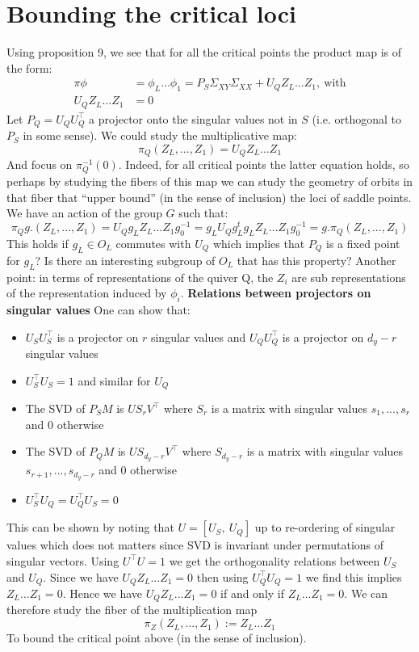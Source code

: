 \documentclass{article}
\theoremstyle{definition}
\begin{document}
\section{Bounding the critical loci}
Using proposition 9, we see that for all the critical points the product map is of the form:
\begin{align*}
    \pi{\phi} & = \phi_L\dots \phi_1 = P_S\Sigma_{XY}\Sigma_{XX} + U_QZ_L\dots Z_1, \ \text{with}\\
    U_QZ_L\dots Z_1 & = 0
\end{align*}
Let $P_Q = U_QU_Q^{\top}$ a projector onto the singular values not in $S$ (i.e. orthogonal to $P_S$ in some sense). We could study the multiplicative map:
\begin{equation*}
    \pi_Q (Z_L,...,Z_1) = U_QZ_L\dots Z_1
\end{equation*}
And focus on $\pi_Q^{-1}(0)$. Indeed, for all critical points the latter equation holds, so perhaps by studying the fibers of this map we can study the geometry of orbits in that fiber that ``upper bound'' (in the sense of inclusion) the loci of saddle points.
We have an action of the group $G$ such that:
\begin{equation*}
    \pi_Q g.(Z_L,...,Z_1) = U_Qg_LZ_L\dots Z_1g_0^{-1} = g_LU_Qg_L^tg_LZ_L\dots Z_1g_0^{-1} = g.\pi_Q (Z_L,...,Z_1)
\end{equation*}
This holds if $g_L\in O_L$ commutes with $U_Q$ which implies that $P_Q$ is a fixed point for $g_L$? Is there an interesting subgroup of $O_L$ that has this property?
Another point: in terms of representations of the quiver Q, the $Z_i$ are sub representations of the representation induced by $\phi_i$.
\textbf{Relations between projectors on singular values}
One can show that:
\begin{itemize}
    \item $U_SU_S^{\top}$ is a projector on $r$ singular values and $U_QU_Q^{\top}$ is a projector on $d_y-r$ singular values
    \item $U_S^{\top}U_S=1$ and similar for $U_Q$
    \item The SVD of $P_SM$ is $US_rV^{\top}$ where $S_r$ is a matrix with singular values $s_1,...,s_r$ and $0$ otherwise
    \item The SVD of $P_QM$ is $US_{d_y -r}V^{\top}$ where $S_{d_{y}-r}$ is a matrix with singular values $s_{r+1},...,s_{d_y-r}$ and $0$ otherwise
    \item $U_S^{\top}U_Q = U_Q^{\top}U_S = 0$
 \end{itemize}
 This can be shown by noting that $U=[U_S, \ U_Q]$ up to re-ordering of singular values which does not matters since SVD is invariant under permutations of singular vectors. Using $U^{\top}U =1$ we get the orthogonality relations between $U_S$ and $U_Q$.
 Since we have $U_QZ_L...Z_1 = 0$ then using $U_Q^{\top}U_Q=1$ we find this implies $Z_L...Z_1 = 0$. Hence we have $U_QZ_L...Z_1 = 0$ if and only if $Z_L...Z_1 = 0$. We can therefore study the fiber of the multiplication map
 \begin{equation*}
    \pi_Z (Z_L,...,Z_1) := Z_L...Z_1
 \end{equation*}
 To bound the critical point above (in the sense of inclusion).
\end{document}
